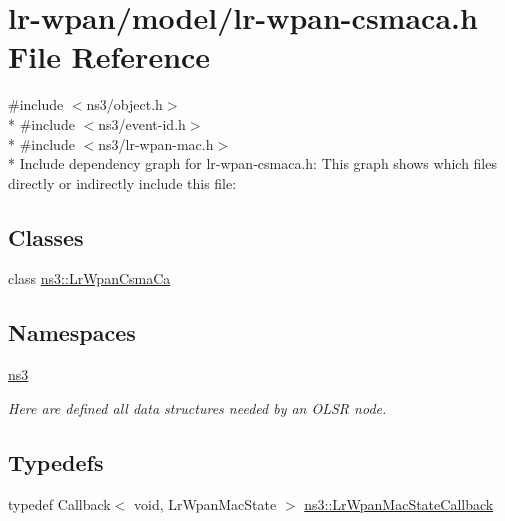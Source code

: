 \hypertarget{lr-wpan-csmaca_8h}{}\section{lr-\/wpan/model/lr-\/wpan-\/csmaca.h File Reference}
\label{lr-wpan-csmaca_8h}
{\ttfamily \#include $<$ns3/object.\+h$>$}\\*
{\ttfamily \#include $<$ns3/event-\/id.\+h$>$}\\*
{\ttfamily \#include $<$ns3/lr-\/wpan-\/mac.\+h$>$}\\*
Include dependency graph for lr-\/wpan-\/csmaca.h\+:
This graph shows which files directly or indirectly include this file\+:
\subsection*{Classes}
\begin{DoxyCompactItemize}
\item 
class \hyperlink{classns3_1_1LrWpanCsmaCa}{ns3\+::\+Lr\+Wpan\+Csma\+Ca}
\end{DoxyCompactItemize}
\subsection*{Namespaces}
\begin{DoxyCompactItemize}
\item 
 \hyperlink{namespacens3}{ns3}
\begin{DoxyCompactList}\small\item\em Here are defined all data structures needed by an O\+L\+SR node. \end{DoxyCompactList}\end{DoxyCompactItemize}
\subsection*{Typedefs}
\begin{DoxyCompactItemize}
\item 
typedef Callback$<$ void, Lr\+Wpan\+Mac\+State $>$ \hyperlink{group__lr-wpan_ga592f91469c801150297e7f1ac939b7ff}{ns3\+::\+Lr\+Wpan\+Mac\+State\+Callback}
\end{DoxyCompactItemize}

